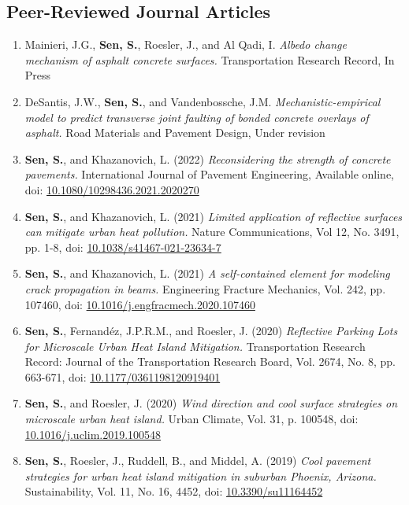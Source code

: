 \documentclass[12pt]{article}
\begin{document}
\subsection*{Peer-Reviewed Journal Articles}
\begin{enumerate}[label=(J\arabic*)]
	\item Mainieri, J.G., \textbf{Sen, S.}, Roesler, J., and Al Qadi, I. \textit{Albedo change mechanism of asphalt concrete surfaces.} Transportation Research Record, In Press
	\item DeSantis, J.W., \textbf{Sen, S.}, and Vandenbossche, J.M. \textit{Mechanistic-empirical model to predict transverse joint faulting of bonded concrete overlays of asphalt.} Road Materials and Pavement Design, Under revision
	\item \textbf{Sen, S.}, and Khazanovich, L. (2022) \textit{Reconsidering the strength of concrete pavements.} International Journal of Pavement Engineering, Available online, doi: \href{https://doi.org/10.1080/10298436.2021.2020270}{10.1080/10298436.2021.2020270}
	\item \textbf{Sen, S.}, and Khazanovich, L. (2021) \textit{Limited application of reflective surfaces can mitigate urban heat pollution.} Nature Communications, Vol 12, No. 3491, pp. 1-8, doi: \href{https://doi.org/10.1038/s41467-021-23634-7}{10.1038/s41467-021-23634-7}
	\item \textbf{Sen, S.}, and Khazanovich, L. (2021) \textit{A self-contained element for modeling crack propagation in beams.} Engineering Fracture Mechanics, Vol. 242, pp. 107460, doi: \href{https://doi.org/10.1016/j.engfracmech.2020.107460}{10.1016/j.engfracmech.2020.107460}			
	\item \textbf{Sen, S.}, Fernand\'ez, J.P.R.M., and Roesler, J. (2020) \textit{Reflective Parking Lots for Microscale Urban Heat Island Mitigation.}  Transportation Research Record: Journal of the Transportation Research Board, Vol. 2674, No. 8, pp. 663-671, doi: \href{https://doi.org/10.1177/0361198120919401}{10.1177/0361198120919401}	
		\item \textbf{Sen, S.}, and Roesler, J. (2020) \textit{Wind direction and cool surface strategies on microscale urban heat island.}  Urban Climate, Vol. 31, p. 100548, doi: \href{https://doi.org/10.1016/j.uclim.2019.100548}{10.1016/j.uclim.2019.100548}
	\item \textbf{Sen, S.}, Roesler, J., Ruddell, B., and Middel, A. (2019) \textit{Cool pavement strategies for urban heat island mitigation in suburban Phoenix, Arizona.}  Sustainability, Vol. 11, No. 16, 4452, doi: \href{https://doi.org/10.3390/su11164452}{10.3390/su11164452}

\end{enumerate}
\end{document}
